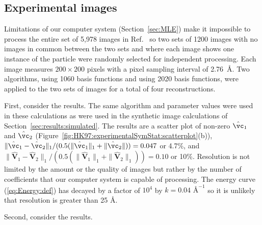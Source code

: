 \subsection{Experimental images}
\label{sec:results:HK97:experimental}
Limitations of our computer system (Section~\ref{sec:MLE}) make it
impossible to process the entire set of 5,978 images in
Ref.~\cite{VeeslerKhayatKrishnamurthySnijderHuangHeckAnandJohnsonHK97Structure2014}
so two sets of 1200 images with no images in common between the two sets
and where each image shows one instance of the particle were randomly
selected for independent processing.
Each image measures $200\times 200$ pixels with a pixel sampling interval
of 2.76~{\AA}.
Two algorithms, {\heterosymparticles} using 1060 basis functions and
{\heterosymstatistics} using 2020 basis functions, were applied to the two
sets of images for a total of four reconstructions.
\par
First, consider the {\heterosymstatistics} results.
The same algorithm and parameter values were used in these calculations as
were used in the synthetic image calculations of
Section~\ref{sec:results:simulated}.
The results are
a scatter plot of non-zero $\hat{\vc}_1$ and $\hat{\vc}_2$
(Figure~\ref{fig:HK97:experimentalSymStat:scatterplot}(b)),
$\|\hat{\vc}_1-\hat{\vc}_2\|_1/(0.5(\|\hat{\vc}_1\|_1+\|\hat{\vc}_2\|))=0.047$
or 4.7\%,
and
$\|\hat{\mathbf{V}}_1-\hat{\mathbf{V}}_2\|_1/(0.5(\|\hat{\mathbf{V}}_1\|_1+\|\hat{\mathbf{V}}_2\|_1))=0.10$ or 10\%.
Resolution is not limited by the amount or the quality of images but rather
by the number of coefficients that our computer system is capable of
processing.
The energy curve (\ref{eq:Energy:def}) has decayed by a factor of $10^4$ by
$k=0.04$ $\mbox{\AA}^{-1}$ so it is unlikely that resolution is greater
than 25 {\AA}.
\par
Second, consider the {\heterosymparticles} results.
